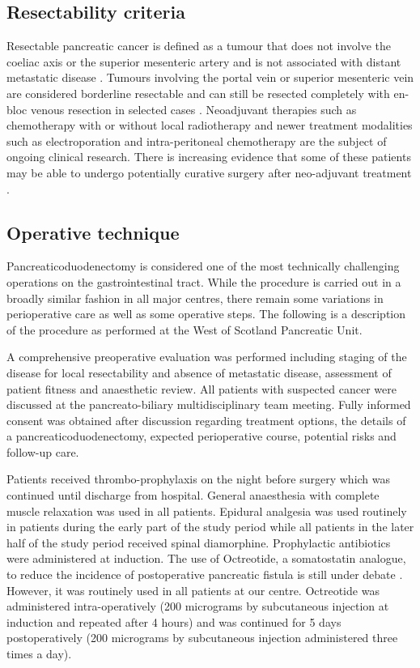 \subsection{Resectability criteria}
\label{sec:resectability_criteria}
Resectable pancreatic cancer is defined as a tumour that does not involve the coeliac axis or the superior mesenteric artery and is not associated with distant metastatic disease \parencite{li_pancreatic_2004}. 
Tumours involving the portal vein or superior mesenteric vein are considered borderline resectable and can still be resected completely with en-bloc venous resection in selected cases \parencite{fuhrman_rationale_1996}. 
Neoadjuvant therapies such as chemotherapy with or without local radiotherapy \parencite{gillen_preoperative/neoadjuvant_2010, evans_preoperative_2008} and newer treatment modalities such as electroporation \parencite{bower_irreversible_2011} and intra-peritoneal chemotherapy \parencite{kamath_rationale_2009} are the subject of ongoing clinical research.
There is increasing evidence that some of these patients may be able to undergo potentially curative surgery after neo-adjuvant treatment \parencite{gillen_preoperative/neoadjuvant_2010}.

\subsection{Operative technique}
Pancreaticoduodenectomy is considered one of the most technically challenging operations on the gastrointestinal tract. 
While the procedure is carried out in a broadly similar fashion in all major centres, there remain some variations in perioperative care as well as some operative steps. 
The following is a description of the procedure as performed at the West of Scotland Pancreatic Unit.

A comprehensive preoperative evaluation was performed including staging of the disease for local resectability and absence of metastatic disease, assessment of patient fitness and anaesthetic review. 
All patients with suspected cancer were discussed at the pancreato-biliary multidisciplinary team meeting. 
Fully informed consent was obtained after discussion regarding treatment options, the details of a pancreaticoduodenectomy, expected perioperative course, potential risks and follow-up care.

Patients received thrombo-prophylaxis on the night before surgery which was continued until discharge from hospital. 
General anaesthesia with complete muscle relaxation was used in all patients. 
Epidural analgesia was used routinely in patients during the early part of the study period while all patients in the later half of the study period received spinal diamorphine. 
Prophylactic antibiotics were administered at induction. 
The use of Octreotide, a somatostatin analogue, to reduce the incidence of postoperative pancreatic fistula is still under debate \parencite{halloran_complications_2002, li_pancreatic_2004} .
However, it was routinely used in all patients at our centre. 
Octreotide was administered intra-operatively (200 micrograms by subcutaneous injection at induction and repeated after 4 hours) and was continued for 5 days postoperatively (200 micrograms by subcutaneous injection administered three times a day).

